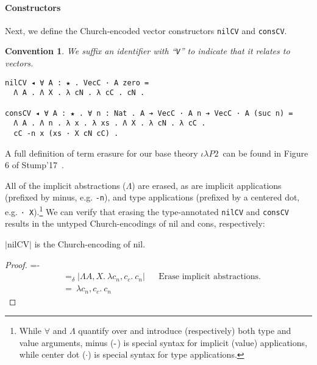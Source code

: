 \documentclass[a4paper,envcountsame,envcountsect]{llncs}
\newtheorem{convention}{Convention}
\newcommand{\eqed}[0]{\tag*{\qed}}
\newcommand{\lablem}[1]{\label{lem:#1}}
\newcommand{\nega}[0]{\ensuremath{{\text -}}}
\newcommand{\cdle}[0]{\ensuremath{\iota \lambda P2}~}
\newcommand{\erase}[1]{\ensuremath{\lvert #1 \rvert}}
\newcommand{\fun}[1]{\lambda #1 .~}
\newcommand{\all}[1]{\Lambda #1 .~}
\newcommand{\by}[1]{\text{#1}}
\newcommand{\name}[1]{\textrm{#1}}
\begin{document}
\paragraph{Constructors}

Next, we define the Church-encoded vector constructors \texttt{nilCV}
and \texttt{consCV}.

\begin{convention}
We suffix an identifier with ``\texttt{V}''
to indicate that it relates to vectors.
\end{convention}

\begin{verbatim}
nilCV ◂ ∀ A : ★ . VecC · A zero =
  Λ A . Λ X . λ cN . λ cC . cN .

consCV ◂ ∀ A : ★ . ∀ n : Nat . A ➔ VecC · A n ➔ VecC · A (suc n) =
  Λ A . Λ n . λ x . λ xs . Λ X . λ cN . λ cC . 
  cC -n x (xs · X cN cC) .
\end{verbatim}

\begin{remark}
A full definition of term erasure for our base theory \cdle can be
found in Figure 6 of Stump'17~\cite{stump17b}.
\end{remark}

All of the implicit abstractions ($\Lambda$) are erased, as are
implicit applications (prefixed by minus, e.g. \texttt{-n}),
and type applications
(prefixed by a centered dot, e.g. \texttt{· X}).\footnote{While
  $\forall$ and $\Lambda$ quantify over and
  introduce (respectively) both type and value arguments,
  minus ($\nega$) is special syntax for implicit (value)
  applications, while center dot ($\cdot$) is special syntax for type
  applications.
  }
We can
verify that erasing the type-annotated \texttt{nilCV} and
\texttt{consCV} results in the untyped Church-encodings of nil and
cons, respectively:

\begin{lemma}
\erase{\name{nilCV}} is the Church-encoding of nil.
\lablem{nilcv}
\end{lemma}

\begin{proof}
{\small
\abovedisplayskip=-\baselineskip
\begin{align*}
  &=_\delta \erase{
    \all{A, X} \fun{c_n, c_c} c_n
  }
  && \by{Erase implicit abstractions.}
  \\
  &=~ \fun{c_n, c_c} c_n
  \eqed
\end{align*}}
\end{proof}
\end{document}
